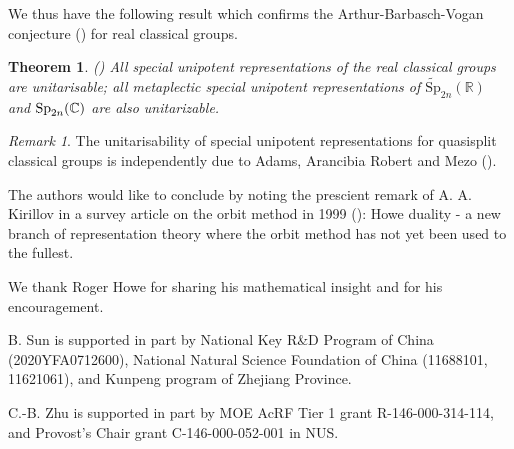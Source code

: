 \documentclass[lang = american]{ems-icm} %
\newcommand{\R}{\mathbb R}
\def\Sp{{\mathrm{Sp}}}
\numberwithin{equation}{section}
\newtheorem{thm}{Theorem}[section]
\theoremstyle{remark}
\newtheorem*{remark}{Remark}
\begin{document}
We thus have the following result which confirms the Arthur-Barbasch-Vogan conjecture (\cite[Introduction]{ABV}) for real classical groups.

\begin{thm}\emph{(\cite{BMSZ3})}
All special unipotent representations of the real classical groups are unitarisable; all metaplectic special unipotent representations of $\widetilde \Sp_{2n}(\R)$ and $\Sp_{2n}(\C)$ are also unitarizable.
\end{thm}

\begin{remark} The unitarisability of special unipotent representations for quasisplit classical groups is independently due to Adams, Arancibia Robert and Mezo (\cite{ARM}).
\end{remark}


The authors would like to conclude by noting the prescient remark of A. A. Kirillov in a survey article on the orbit method in 1999 (\cite{Ki2}): Howe duality - a new branch of representation theory where the orbit method has not yet been used to the fullest.


\begin{ack}
We thank Roger Howe for sharing his mathematical insight and for his encouragement.
\end{ack}

\begin{funding}
B. Sun is supported in part by National Key R\&D Program of China \linebreak
(2020YFA0712600), National Natural Science Foundation of China (11688101, 11621061), and Kunpeng program of Zhejiang Province.
\end{funding}

\begin{funding}
C.-B. Zhu is supported in part by MOE AcRF Tier 1 grant R-146-000-314-114, and Provost's Chair grant C-146-000-052-001 in NUS.
\end{funding}


\end{document}
